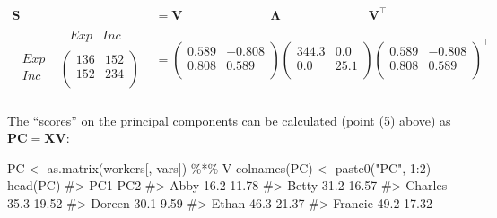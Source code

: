 \documentclass[
  letterpaper,
  10pt,
  krantz2]{krantz}
\makeatletter
\newenvironment{Shaded}{\begin{snugshade}}{\end{snugshade}}
\newcommand{\CommentTok}[1]{\textcolor[rgb]{0.37,0.37,0.37}{#1}}
\newcommand{\DecValTok}[1]{\textcolor[rgb]{0.68,0.00,0.00}{#1}}
\newcommand{\FunctionTok}[1]{\textcolor[rgb]{0.28,0.35,0.67}{#1}}
\newcommand{\NormalTok}[1]{\textcolor[rgb]{0.00,0.23,0.31}{#1}}
\newcommand{\OtherTok}[1]{\textcolor[rgb]{0.00,0.23,0.31}{#1}}
\newcommand{\SpecialCharTok}[1]{\textcolor[rgb]{0.37,0.37,0.37}{#1}}
\newcommand{\StringTok}[1]{\textcolor[rgb]{0.13,0.47,0.30}{#1}}
\newenvironment{kframe}{%
  \medskip{}
  \setlength{\fboxsep}{.8em}
  \def\at@end@of@kframe{}%
  \ifinner\ifhmode%
  \def\at@end@of@kframe{\end{minipage}}%
  \begin{minipage}{\columnwidth}%
  \fi\fi%
  \def\FrameCommand##1{\hskip\@totalleftmargin \hskip-\fboxsep
  \colorbox{shadecolor}{##1}\hskip-\fboxsep
      \hskip-\linewidth \hskip-\@totalleftmargin \hskip\columnwidth}%
  \MakeFramed {\advance\hsize-\width
    \@totalleftmargin\z@ \linewidth\hsize
    \@setminipage}}%
{\par\unskip\endMakeFramed%
  \at@end@of@kframe}
\renewenvironment{Shaded}{\begin{kframe}}{\end{kframe}}
\makeatother
\begin{document}
\begin{align*}
\mathbf{S} & = \mathbf{V} \phantom{00000000000000} 
     \mathbf{\Lambda} \phantom{00000000000000}  
     \mathbf{V}^\top \\ 
\begin{matrix}
  &  \begin{matrix} \phantom{i} Exp & Inc
  \end{matrix} \\ 
 \begin{matrix}  
   Exp\\ 
   Inc\\ 
\end{matrix}  & 
\begin{pmatrix}  
136 & 152 \\ 
152 & 234 \\ 
\end{pmatrix}
\\ 
\end{matrix} 
& =\begin{pmatrix} 
 0.589 & -0.808 \\ 
 0.808 &  0.589 \\ 
\end{pmatrix}
  \begin{pmatrix} 
344.3 &   0.0 \\ 
  0.0 &  25.1 \\ 
\end{pmatrix}
  \begin{pmatrix} 
 0.589 & -0.808 \\ 
 0.808 &  0.589 \\ 
\end{pmatrix}^\top
\end{align*}

The ``scores'' on the principal components can be calculated (point (5)
above) as \(\mathbf{PC} = \mathbf{X} \mathbf{V}\):

\begin{Shaded}
\begin{Highlighting}[]
\NormalTok{PC }\OtherTok{\textless{}{-}} \FunctionTok{as.matrix}\NormalTok{(workers[, vars]) }\SpecialCharTok{\%*\%}\NormalTok{ V}
\FunctionTok{colnames}\NormalTok{(PC) }\OtherTok{\textless{}{-}} \FunctionTok{paste0}\NormalTok{(}\StringTok{"PC"}\NormalTok{, }\DecValTok{1}\SpecialCharTok{:}\DecValTok{2}\NormalTok{)}
\FunctionTok{head}\NormalTok{(PC)}
\CommentTok{\#\textgreater{}          PC1   PC2}
\CommentTok{\#\textgreater{} Abby    16.2 11.78}
\CommentTok{\#\textgreater{} Betty   31.2 16.57}
\CommentTok{\#\textgreater{} Charles 35.3 19.52}
\CommentTok{\#\textgreater{} Doreen  30.1  9.59}
\CommentTok{\#\textgreater{} Ethan   46.3 21.37}
\CommentTok{\#\textgreater{} Francie 49.2 17.32}
\end{Highlighting}
\end{Shaded}
\end{document}
